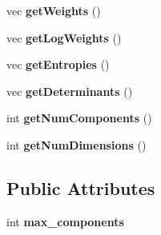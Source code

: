 \begin{DoxyCompactItemize}
\item 
vec {\bfseries get\+Weights} ()\hypertarget{classGMM_a23d3f84a62535b3fbb3ef5cf9385f58b}{}\label{classGMM_a23d3f84a62535b3fbb3ef5cf9385f58b}

\item 
vec {\bfseries get\+Log\+Weights} ()\hypertarget{classGMM_a56ffba07ec2803f25444592f275b3d31}{}\label{classGMM_a56ffba07ec2803f25444592f275b3d31}

\item 
vec {\bfseries get\+Entropies} ()\hypertarget{classGMM_a9c9d5c5fa14d84de0a0d0fd249cf705e}{}\label{classGMM_a9c9d5c5fa14d84de0a0d0fd249cf705e}

\item 
vec {\bfseries get\+Determinants} ()\hypertarget{classGMM_a060c1a9c7a363ce01d7220500fc1db2d}{}\label{classGMM_a060c1a9c7a363ce01d7220500fc1db2d}

\item 
int {\bfseries get\+Num\+Components} ()\hypertarget{classGMM_a0db6332cddaa01a06caafada3c6354c7}{}\label{classGMM_a0db6332cddaa01a06caafada3c6354c7}

\item 
int {\bfseries get\+Num\+Dimensions} ()\hypertarget{classGMM_a6e11a4916285155c0acb69beb02560bd}{}\label{classGMM_a6e11a4916285155c0acb69beb02560bd}

\end{DoxyCompactItemize}
\subsection*{Public Attributes}
\begin{DoxyCompactItemize}
\item 
int {\bfseries max\+\_\+components}\hypertarget{classGMM_af0c5335a6c9ac80c07d3212314e0d8b6}{}\label{classGMM_af0c5335a6c9ac80c07d3212314e0d8b6}

\end{DoxyCompactItemize}
